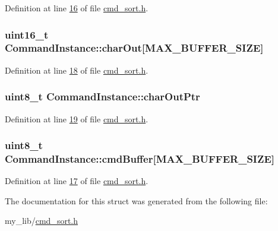 Definition at line \hyperlink{cmd__sort_8h_source_l00016}{16} of file \hyperlink{cmd__sort_8h_source}{cmd\-\_\-sort.\-h}.

\hypertarget{struct_command_instance_af1524bd8db77ca27b543a3c2a1a5638f}{
\subsubsection[{char\-Out}]{\setlength{\rightskip}{0pt plus 5cm}uint16\-\_\-t Command\-Instance\-::char\-Out\mbox{[}{\bf M\-A\-X\-\_\-\-B\-U\-F\-F\-E\-R\-\_\-\-S\-I\-Z\-E}\mbox{]}}}\label{struct_command_instance_af1524bd8db77ca27b543a3c2a1a5638f}


Definition at line \hyperlink{cmd__sort_8h_source_l00018}{18} of file \hyperlink{cmd__sort_8h_source}{cmd\-\_\-sort.\-h}.

\hypertarget{struct_command_instance_a4817d15d26b34d5b4ae000d12e4d73ac}{
\subsubsection[{char\-Out\-Ptr}]{\setlength{\rightskip}{0pt plus 5cm}uint8\-\_\-t Command\-Instance\-::char\-Out\-Ptr}}\label{struct_command_instance_a4817d15d26b34d5b4ae000d12e4d73ac}


Definition at line \hyperlink{cmd__sort_8h_source_l00019}{19} of file \hyperlink{cmd__sort_8h_source}{cmd\-\_\-sort.\-h}.

\hypertarget{struct_command_instance_a8b8b51e6eacf265b2fb0c83dc8fc8823}{
\subsubsection[{cmd\-Buffer}]{\setlength{\rightskip}{0pt plus 5cm}uint8\-\_\-t Command\-Instance\-::cmd\-Buffer\mbox{[}{\bf M\-A\-X\-\_\-\-B\-U\-F\-F\-E\-R\-\_\-\-S\-I\-Z\-E}\mbox{]}}}\label{struct_command_instance_a8b8b51e6eacf265b2fb0c83dc8fc8823}


Definition at line \hyperlink{cmd__sort_8h_source_l00017}{17} of file \hyperlink{cmd__sort_8h_source}{cmd\-\_\-sort.\-h}.



The documentation for this struct was generated from the following file\-:\begin{DoxyCompactItemize}
\item 
my\-\_\-lib/\hyperlink{cmd__sort_8h}{cmd\-\_\-sort.\-h}\end{DoxyCompactItemize}

